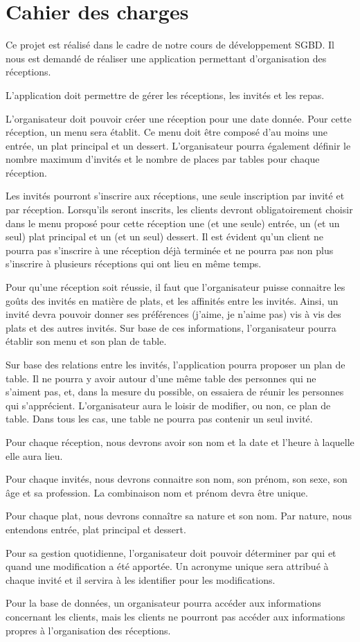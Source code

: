 \chapter{Cahier des charges}

Ce projet est réalisé dans le cadre de notre cours de développement SGBD. Il nous est demandé de réaliser une application permettant d'organisation des réceptions.

L'application doit permettre de gérer les réceptions, les invités et les repas.

L'organisateur doit pouvoir créer une réception pour une date donnée. Pour cette réception, un menu sera établit. Ce menu doit être composé d'au moins une entrée, un plat principal et un dessert. L'organisateur pourra également définir le nombre maximum d'invités et le nombre de places par tables pour chaque réception.

Les invités pourront s'inscrire aux réceptions, une seule inscription par invité et par réception. Lorsqu'ils seront inscrits, les clients devront obligatoirement choisir dans le menu proposé pour cette réception une (et une seule) entrée, un (et un seul) plat principal et un (et un seul) dessert. Il est évident qu'un client ne pourra pas s'inscrire à une réception déjà terminée et ne pourra pas non plus s'inscrire à plusieurs réceptions qui ont lieu en même temps.

Pour qu'une réception soit réussie, il faut que l'organisateur puisse connaitre les goûts des invités en matière de plats, et les affinités entre les invités. Ainsi, un invité devra pouvoir donner ses préférences (\og{}j'aime\fg{}, \og{}je n'aime pas\fg{}) vis à vis des plats et des autres invités. Sur base de ces informations, l'organisateur pourra établir son menu et son plan de table.

Sur base des relations entre les invités, l'application pourra proposer un plan de table. Il ne pourra y avoir autour d'une même table des personnes qui ne s'aiment pas, et, dans la mesure du possible, on essaiera de réunir les personnes qui s'apprécient. L'organisateur aura le loisir de modifier, ou non, ce plan de table. Dans tous les cas, une table ne pourra pas contenir un seul invité.

Pour chaque réception, nous devrons avoir son nom et la date et l'heure à laquelle elle aura lieu.

Pour chaque invités,  nous devrons connaitre son nom, son prénom, son sexe, son âge et sa profession. La combinaison \og{}nom\fg{} et \og{}prénom\fg{} devra être unique.

Pour chaque plat, nous devrons connaître sa nature et son nom. Par nature, nous entendons \og{}entrée\fg{}, \og{}plat principal\fg{} et \og{}dessert\fg{}.

Pour sa gestion quotidienne, l'organisateur doit pouvoir déterminer par qui et quand une modification a été apportée. Un acronyme unique sera attribué à chaque invité et il servira à les identifier pour les modifications.

Pour la base de données, un organisateur pourra accéder aux informations concernant les clients, mais les clients ne pourront pas accéder aux informations propres à l'organisation des réceptions.
